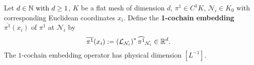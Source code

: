 \begin{definition}
  Let
    $d \in \mathbb{N}\ \text{with}\ d \geq 1$,
    $K$ be a flat mesh of dimension $d$,
    $\pi^1 \in C^1 K$,
    $\mathcal{N}_i \in K_0$ with corresponding Euclidean coordinates $x_i$.
  Define the \textbf{1-cochain embedding} $\overline{\pi^1}(x_i)$
  of $\pi^1$ at $\mathcal{N}_i$ by
  \begin{equation}
    \overline{\pi^1}(x_i) :=
    \left(\mathcal{L}_{\mathcal{N}_i}\right)^* \widehat{\pi^1}_{\mathcal{N}_i}
    \in \mathbb{R}^d.
  \end{equation}
  The $1$-cochain embedding operator has physical dimension $[L^{-1}]$.
\end{definition}
